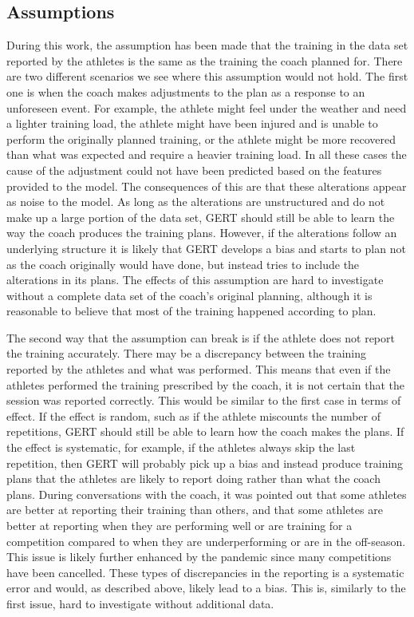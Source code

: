 \subsection{Assumptions}
During this work, the assumption has been made that the training in the data set reported by the athletes is the same as the training the coach planned for.
There are two different scenarios we see where this assumption would not hold.
The first one is when the coach makes adjustments to the plan as a response to an unforeseen event.
For example, the athlete might feel under the weather and need a lighter training load, the athlete might have been injured and is unable to perform the originally planned training, or the athlete might be more recovered than what was expected and require a heavier training load.
In all these cases the cause of the adjustment could not have been predicted based on the features provided to the model.
The consequences of this are that these alterations appear as noise to the model.
As long as the alterations are unstructured and do not make up a large portion of the data set, GERT should still be able to learn the way the coach produces the training plans.
However, if the alterations follow an underlying structure it is likely that GERT develops a bias and starts to plan not as the coach originally would have done, but instead tries to include the alterations in its plans.
The effects of this assumption are hard to investigate without a complete data set of the coach's original planning, although it is reasonable to believe that most of the training happened according to plan.

The second way that the assumption can break is if the athlete does not report the training accurately.
There may be a discrepancy between the training reported by the athletes and what was performed.
This means that even if the athletes performed the training prescribed by the coach, it is not certain that the session was reported correctly.
This would be similar to the first case in terms of effect.
If the effect is random, such as if the athlete miscounts the number of repetitions, GERT should still be able to learn how the coach makes the plans.
If the effect is systematic, for example, if the athletes always skip the last repetition, then GERT will probably pick up a bias and instead produce training plans that the athletes are likely to report doing rather than what the coach plans.
During conversations with the coach, it was pointed out that some athletes are better at reporting their training than others, and that some athletes are better at reporting when they are performing well or are training for a competition compared to when they are underperforming or are in the off-season.
This issue is likely further enhanced by the pandemic since many competitions have been cancelled.
These types of discrepancies in the reporting is a systematic error and would, as described above, likely lead to a bias.
This is, similarly to the first issue, hard to investigate without additional data.

